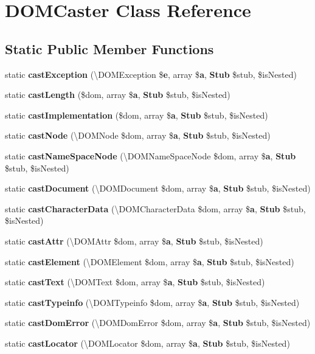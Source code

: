 \section{D\+O\+M\+Caster Class Reference}
\label{class_symfony_1_1_component_1_1_var_dumper_1_1_caster_1_1_d_o_m_caster}
\subsection*{Static Public Member Functions}
\begin{DoxyCompactItemize}
\item 
static {\bf cast\+Exception} (\textbackslash{}D\+O\+M\+Exception \${\bf e}, array \${\bf a}, {\bf Stub} \$stub, \$is\+Nested)
\item 
static {\bf cast\+Length} (\$dom, array \${\bf a}, {\bf Stub} \$stub, \$is\+Nested)
\item 
static {\bf cast\+Implementation} (\$dom, array \${\bf a}, {\bf Stub} \$stub, \$is\+Nested)
\item 
static {\bf cast\+Node} (\textbackslash{}D\+O\+M\+Node \$dom, array \${\bf a}, {\bf Stub} \$stub, \$is\+Nested)
\item 
static {\bf cast\+Name\+Space\+Node} (\textbackslash{}D\+O\+M\+Name\+Space\+Node \$dom, array \${\bf a}, {\bf Stub} \$stub, \$is\+Nested)
\item 
static {\bf cast\+Document} (\textbackslash{}D\+O\+M\+Document \$dom, array \${\bf a}, {\bf Stub} \$stub, \$is\+Nested)
\item 
static {\bf cast\+Character\+Data} (\textbackslash{}D\+O\+M\+Character\+Data \$dom, array \${\bf a}, {\bf Stub} \$stub, \$is\+Nested)
\item 
static {\bf cast\+Attr} (\textbackslash{}D\+O\+M\+Attr \$dom, array \${\bf a}, {\bf Stub} \$stub, \$is\+Nested)
\item 
static {\bf cast\+Element} (\textbackslash{}D\+O\+M\+Element \$dom, array \${\bf a}, {\bf Stub} \$stub, \$is\+Nested)
\item 
static {\bf cast\+Text} (\textbackslash{}D\+O\+M\+Text \$dom, array \${\bf a}, {\bf Stub} \$stub, \$is\+Nested)
\item 
static {\bf cast\+Typeinfo} (\textbackslash{}D\+O\+M\+Typeinfo \$dom, array \${\bf a}, {\bf Stub} \$stub, \$is\+Nested)
\item 
static {\bf cast\+Dom\+Error} (\textbackslash{}D\+O\+M\+Dom\+Error \$dom, array \${\bf a}, {\bf Stub} \$stub, \$is\+Nested)
\item 
static {\bf cast\+Locator} (\textbackslash{}D\+O\+M\+Locator \$dom, array \${\bf a}, {\bf Stub} \$stub, \$is\+Nested)

\end{DoxyCompactItemize}
